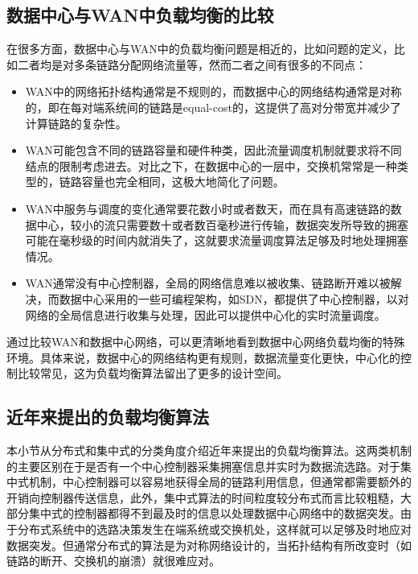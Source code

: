 \subsection{数据中心与WAN中负载均衡的比较}

在很多方面，数据中心与WAN中的负载均衡问题是相近的，比如问题的定义，比如二者均是对多条链路分配网络流量等，然而二者之间有很多的不同点：
\begin{itemize}
    \item WAN中的网络拓扑结构通常是不规则的，而数据中心的网络结构通常是对称的，即在每对端系统间的链路是equal-cost的，这提供了高对分带宽并减少了计算链路的复杂性。
    \item WAN可能包含不同的链路容量和硬件种类，因此流量调度机制就要求将不同结点的限制考虑进去。对比之下，在数据中心的一层中，交换机常常是一种类型的，链路容量也完全相同，这极大地简化了问题。
    \item WAN中服务与调度的变化通常要花数小时或者数天，而在具有高速链路的数据中心，较小的流只需要数十或者数百毫秒进行传输，数据突发所导致的拥塞可能在毫秒级的时间内就消失了，这就要求流量调度算法足够及时地处理拥塞情况。
    \item WAN通常没有中心控制器，全局的网络信息难以被收集、链路断开难以被解决，而数据中心采用的一些可编程架构，如SDN，都提供了中心控制器，以对网络的全局信息进行收集与处理，因此可以提供中心化的实时流量调度。
\end{itemize}

通过比较WAN和数据中心网络，可以更清晰地看到数据中心网络负载均衡的特殊环境。具体来说，数据中心的网络结构更有规则，数据流量变化更快，中心化的控制比较常见，这为负载均衡算法留出了更多的设计空间。

\subsection{近年来提出的负载均衡算法}

本小节从分布式和集中式的分类角度介绍近年来提出的负载均衡算法。这两类机制的主要区别在于是否有一个中心控制器采集拥塞信息并实时为数据流选路。对于集中式机制，中心控制器可以容易地获得全局的链路利用信息，但通常都需要额外的开销向控制器传送信息，此外，集中式算法的时间粒度较分布式而言比较粗糙，大部分集中式的控制器都得不到最及时的信息以处理数据中心网络中的数据突发。由于分布式系统中的选路决策发生在端系统或交换机处，这样就可以足够及时地应对数据突发。但通常分布式的算法是为对称网络设计的，当拓扑结构有所改变时（如链路的断开、交换机的崩溃）就很难应对。

